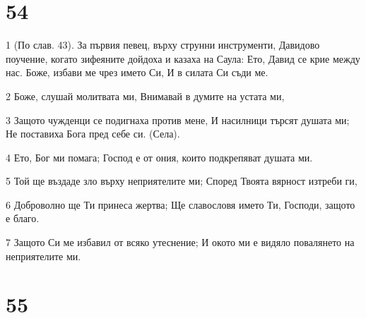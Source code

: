 \chapter{54}

\par 1 (По слав. 43). За първия певец, върху струнни инструменти, Давидово поучение, когато зифеяните дойдоха и казаха на Саула: Ето, Давид се крие между нас. Боже, избави ме чрез името Си, И в силата Си съди ме.
\par 2 Боже, слушай молитвата ми, Внимавай в думите на устата ми,
\par 3 Защото чужденци се подигнаха против мене, И насилници търсят душата ми; Не поставиха Бога пред себе си. (Села).
\par 4 Ето, Бог ми помага; Господ е от ония, които подкрепяват душата ми.
\par 5 Той ще въздаде зло върху неприятелите ми; Според Твоята вярност изтреби ги,
\par 6 Доброволно ще Ти принеса жертва; Ще славословя името Ти, Господи, защото е благо.
\par 7 Защото Си ме избавил от всяко утеснение; И окото ми е видяло повалянето на неприятелите ми.

\chapter{55}

